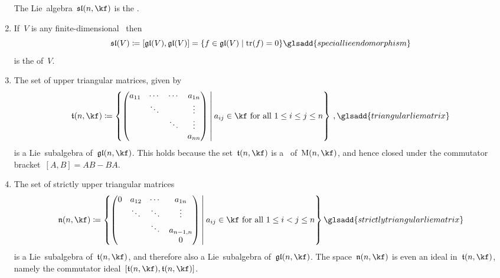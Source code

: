 \begin{examples}
\begin{enumerate}
      The Lie~algebra~$\sllie(n, \kf)$ is the .
    \item
      If~$V$ is any finite-dimensional~{\vectorspace{$\kf$}} then
      \[
        \sllie(V)
        \defined
        [\gllie(V), \gllie(V)]
        =
        \{
          f \in \gllie(V)
        \suchthat
          \tr(f) = 0
        \}
        \glsadd{special lie endomorphism}
      \]
      is the  of~$V$.
    \item
      The set of upper triangular matrices, given by
      \[
        \tlie(n, \kf)
        \defined
        \left\{
          \begin{pmatrix}
              a_{11}
            & \cdots
            & \cdots
            & a_{1n}
            \\
              {}
            & \ddots
            & {}
            & \vdots
            \\
              {}
            & {}
            & \ddots
            & \vdots
            \\
              {}
            & {}
            & {}
            & a_{nn}
          \end{pmatrix}
        \suchthat*
          \text{$a_{ij} \in \kf$ for all~$1 \leq i \leq j \leq n$}
        \right\} \,,
        \glsadd{triangular lie matrix}
      \]
      is a Lie~subalgebra of~$\gllie(n, \kf)$.
      This holds because the set~$\tlie(n, \kf)$ is a~{\subalgebra{$\kf$}} of~$\Mat(n, \kf)$, and hence closed under the commutator bracket~$[A,B] = AB - BA$.
   
    \item
      The set of strictly upper triangular matrices
      \[
        \nlie(n, \kf)
        \defined
        \left\{
          \begin{pmatrix}
              0
            & a_{12}
            & \cdots
            & a_{1n}
            \\
              {}
            & \ddots
            & \ddots
            & \vdots
            \\
              {}
            & {}
            & \ddots
            & a_{n-1,n}
            \\
              {}
            & {}
            & {}
            & 0
          \end{pmatrix}
        \suchthat*
          \text{$a_{ij} \in \kf$ for all~$1 \leq i < j \leq n$}
        \right\}
        \glsadd{strictly triangular lie matrix}
      \]
      is a Lie~subalgebra of~$\tlie(n, \kf)$, and therefore also a Lie~subalgebra of~$\gllie(n, \kf)$.
      The space~$\nlie(n, \kf)$ is even an ideal in~$\tlie(n, \kf)$, namely the commutator ideal~$[\tlie(n, \kf), \tlie(n, \kf)]$.
    

\end{enumerate}
\end{examples}
